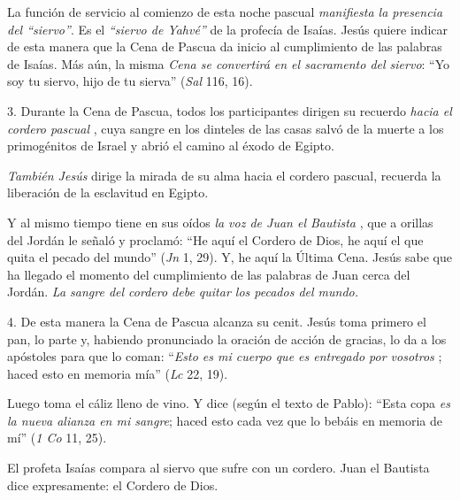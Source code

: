 			\begin{body}La función de servicio al comienzo de esta noche pascual \textit{manifiesta la presencia del “siervo”}. Es el \textit{“siervo de Yahvé”} de la profecía de Isaías. Jesús quiere indicar de esta manera que la Cena de Pascua da inicio al cumplimiento de las palabras de Isaías. Más aún, la misma \textit{Cena se convertirá en el sacramento del siervo}: “Yo soy tu siervo, hijo de tu sierva” (\textit{Sal} 116, 16). \end{body}
			
			\begin{body}3. Durante la Cena de Pascua, todos los participantes dirigen su recuerdo \textit{hacia el cordero pascual} , cuya sangre en los dinteles de las casas salvó de la muerte a los primogénitos de Israel y abrió el camino al éxodo de Egipto. \end{body}
			
			\begin{body}\textit{También Jesús} dirige la mirada de su alma hacia el cordero pascual, recuerda la liberación de la esclavitud en Egipto. \end{body}
			
			\begin{body}Y al mismo tiempo tiene en sus oídos \textit{la voz de Juan el Bautista} , que a orillas del Jordán le señaló y proclamó: “He aquí el Cordero de Dios, he aquí el que quita el pecado del mundo” (\textit{Jn }1, 29). Y, he aquí la Última Cena. Jesús sabe que ha llegado el momento del cumplimiento de las palabras de Juan cerca del Jordán. \textit{La sangre del cordero debe quitar los pecados del mundo. }\end{body}
			
			\begin{body}4. De esta manera la Cena de Pascua alcanza su cenit. Jesús toma primero el pan, lo parte y, habiendo pronunciado la oración de acción de gracias, lo da a los apóstoles para que lo coman: “\textit{Esto es mi cuerpo que es entregado por vosotros} ; haced esto en memoria mía” (\textit{Lc }22, 19). \end{body}
			
			\begin{body}Luego toma el cáliz lleno de vino. Y dice (según el texto de Pablo): “Esta copa \textit{es la nueva alianza en mi sangre}; haced esto cada vez que lo bebáis en memoria de mí” (\textit{1 Co }11, 25). \end{body}
			
			\begin{body}El profeta Isaías compara al siervo que sufre con un cordero. Juan el Bautista dice expresamente: el Cordero de Dios. \end{body}
			
